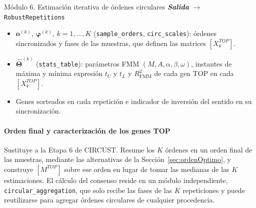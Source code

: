 \documentclass[12pt, a4paper]{report}
\newcommand{\dato}[2]{{\boldmath\textcolor{#1}{#2}}}
\begin{document}
\begin{panel}{Módulo 6. Estimación iterativa de órdenes circulares}
\textit{\textbf{Salida}} \(\rightarrow\) \texttt{RobustRepetitions}
\begin{itemize}[nosep,leftmargin=1.5em]
\item \dato{dK}{\(\mathbf{o}^{(k)}\), \(\boldsymbol{\varphi}^{(k)}\), \(k=1,\ldots,K\) (\texttt{sample\_orders}, \texttt{circ\_scales})}: órdenes sincronizados y fases de las muestras, que definen las matrices \([X^{TOP}_k]\).
\item \dato{dK}{\(\widehat{\boldsymbol{\Theta}}^{(k)}\) (\texttt{stats\_table})}: parámetros FMM \((M,A,\alpha,\beta,\omega)\), instantes de máxima y mínima expresión \(t_U\) y \(t_L\) y \(R^2_{\mathrm{FMM}}\) de cada gen TOP en cada \([X^{TOP}_k]\).
\item Genes sorteados en cada repetición e indicador de inversión del sentido en su sincronización.
\end{itemize}
\end{panel}

\paragraph{Orden final y caracterización de los genes TOP}
Sustituye a la Etapa 6 de CIRCUST. Resume los \(K\) órdenes en un orden final de las muestras, mediante las alternativas de la Sección~\ref{sec:ordenOptimo}, y construye \([M^{TOP}]\) sobre ese orden en lugar de tomar las medianas de las \(K\) estimaciones. El cálculo del consenso reside en un módulo independiente, \texttt{circular\_aggregation}, que solo recibe las fases de las \(K\) repeticiones y puede reutilizarse para agregar órdenes circulares de cualquier procedencia.
\end{document}
